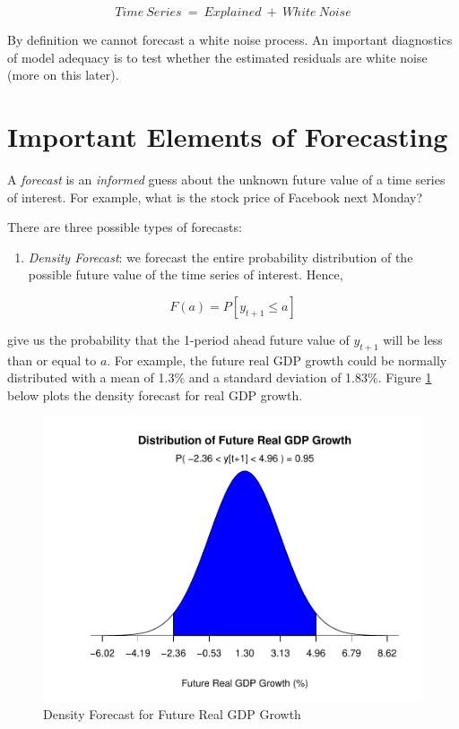 \documentclass[]{book}
\providecommand{\tightlist}{%
  \setlength{\itemsep}{0pt}\setlength{\parskip}{0pt}}
\theoremstyle{definition}
\theoremstyle{definition}
\theoremstyle{definition}
\theoremstyle{remark}
\let\BeginKnitrBlock\begin \let\EndKnitrBlock\end
\begin{document}
\begin{equation}
Time \ Series \ = \  Explained  \ + \ White \ Noise
\end{equation}

By definition we cannot forecast a white noise process. An important
diagnostics of model adequacy is to test whether the estimated residuals
are white noise (more on this later).

\hypertarget{important-elements-of-forecasting}{%
\section{Important Elements of
Forecasting}\label{important-elements-of-forecasting}}

\BeginKnitrBlock{definition}[Forecast]
\protect\hypertarget{def:d1}{}{\label{def:d1} {} }
\EndKnitrBlock{definition}

A \emph{forecast} is an \emph{informed} guess about the unknown future
value of a time series of interest. For example, what is the stock price
of Facebook next Monday?

There are three possible types of forecasts:

\begin{enumerate}
\def\labelenumi{\arabic{enumi}.}
\tightlist
\item
  \emph{Density Forecast}: we forecast the entire probability
  distribution of the possible future value of the time series of
  interest. Hence,
\end{enumerate}

\begin{equation}
F(a)=P[y_{t+1}\leq a]
\end{equation}

give us the probability that the 1-period ahead future value of
\(y_{t+1}\) will be less than or equal to \(a\). For example, the future
real GDP growth could be normally distributed with a mean of 1.3\% and a
standard deviation of 1.83\%. Figure \ref{fig:ch1-figure3} below plots
the density forecast for real GDP growth.

\begin{figure}

{\centering \includegraphics[width=0.8\linewidth]{bookdown-demo_files/figure-latex/ch1-figure3-1} 

}

\caption{Density Forecast for Future Real GDP Growth}\label{fig:ch1-figure3}
\end{figure}
\end{document}

